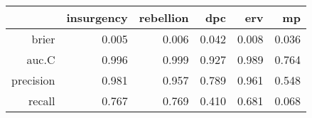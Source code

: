 \begin{tabular}{rrrrrr}
  \hline
 & insurgency & rebellion & dpc & erv & mp \\ 
  \hline
brier & 0.005 & 0.006 & 0.042 & 0.008 & 0.036 \\ 
  auc.C & 0.996 & 0.999 & 0.927 & 0.989 & 0.764 \\ 
  precision & 0.981 & 0.957 & 0.789 & 0.961 & 0.548 \\ 
  recall & 0.767 & 0.769 & 0.410 & 0.681 & 0.068 \\ 
   \hline
\end{tabular}
